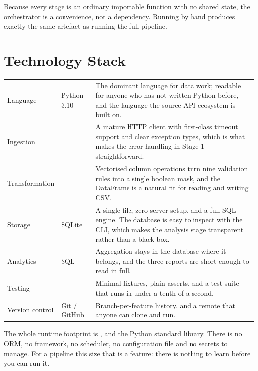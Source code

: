Because every stage is an ordinary importable function with no shared state,
the orchestrator is a convenience, not a dependency. Running
 by hand produces exactly the
same artefact as running the full pipeline.

\section{Technology Stack}

\noindent
\begin{tabularx}{\textwidth}{@{}L{3.3cm}L{4.3cm}Y@{}}
 &  &  \\
\midrule
Language & Python 3.10+ & The dominant language for data work; readable for
  anyone who has not written Python before, and the language the source API
  ecosystem is built on. \\
\addlinespace
Ingestion &  & A mature HTTP client with first-class timeout
  support and clear exception types, which is what makes the error handling
  in Stage 1 straightforward. \\
\addlinespace
Transformation &  & Vectorised column operations turn nine
  validation rules into a single boolean mask, and the DataFrame is a
  natural fit for reading and writing CSV. \\
\addlinespace
Storage & SQLite & A single file, zero server setup, and a full SQL engine.
  The database is easy to inspect with the  CLI, which makes
  the analysis stage transparent rather than a black box. \\
\addlinespace
Analytics & SQL & Aggregation stays in the database where it belongs, and
  the three reports are short enough to read in full. \\
\addlinespace
Testing &  & Minimal fixtures, plain asserts, and a test
  suite that runs in under a tenth of a second. \\
\addlinespace
Version control & Git / GitHub & Branch-per-feature history, and a remote
  that anyone can clone and run. \\
\end{tabularx}

The whole runtime footprint is ,  and the
Python standard library. There is no ORM, no framework, no scheduler, no
configuration file and no secrets to manage. For a pipeline this size that
is a feature: there is nothing to learn before you can run it.

